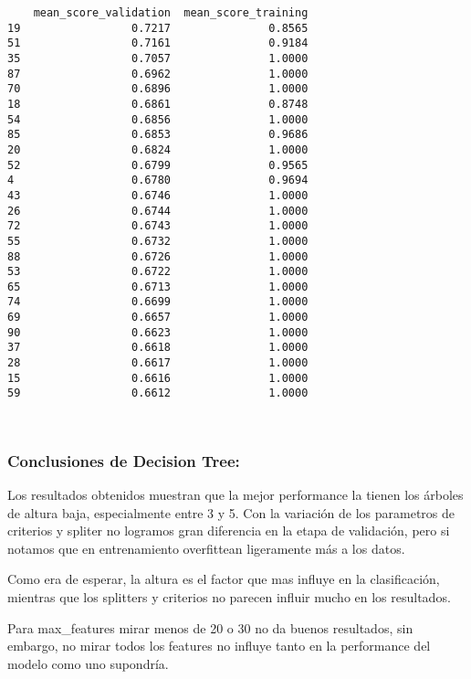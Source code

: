\documentclass[11pt]{article}
\begin{document}
\begin{verbatim}
    mean_score_validation  mean_score_training  
19                 0.7217               0.8565  
51                 0.7161               0.9184  
35                 0.7057               1.0000  
87                 0.6962               1.0000  
70                 0.6896               1.0000  
18                 0.6861               0.8748  
54                 0.6856               1.0000  
85                 0.6853               0.9686  
20                 0.6824               1.0000  
52                 0.6799               0.9565  
4                  0.6780               0.9694  
43                 0.6746               1.0000  
26                 0.6744               1.0000  
72                 0.6743               1.0000  
55                 0.6732               1.0000  
88                 0.6726               1.0000  
53                 0.6722               1.0000  
65                 0.6713               1.0000  
74                 0.6699               1.0000  
69                 0.6657               1.0000  
90                 0.6623               1.0000  
37                 0.6618               1.0000  
28                 0.6617               1.0000  
15                 0.6616               1.0000  
59                 0.6612               1.0000  
    \end{verbatim}

    
    \begin{Verbatim}[commandchars=\\\{\}]
 

    \end{Verbatim}

    \subsubsection{Conclusiones de Decision
Tree:}\label{conclusiones-de-decision-tree}

Los resultados obtenidos muestran que la mejor performance la tienen los
árboles de altura baja, especialmente entre 3 y 5. Con la variación de
los parametros de criterios y spliter no logramos gran diferencia en la
etapa de validación, pero si notamos que en entrenamiento overfittean
ligeramente más a los datos.

Como era de esperar, la altura es el factor que mas influye en la
clasificación, mientras que los splitters y criterios no parecen influir
mucho en los resultados.

Para max\_features mirar menos de 20 o 30 no da buenos resultados, sin
embargo, no mirar todos los features no influye tanto en la performance
del modelo como uno supondría.
\end{document}
